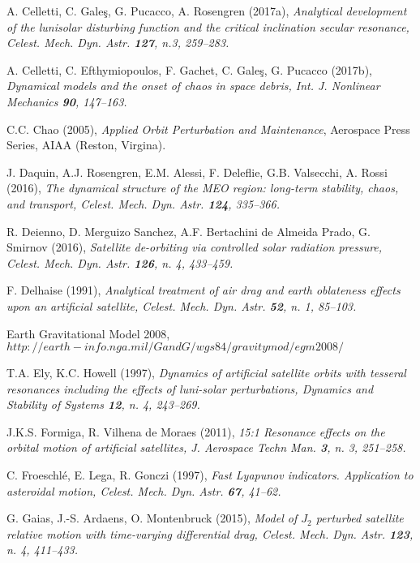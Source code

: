 \documentclass[12pt,reqno]{amsart}
\numberwithin{equation}{section}
\begin{document}
\begin{thebibliography}{}
A. Celletti, C. Gale\c s, G. Pucacco, A. Rosengren (2017a), \sl Analytical development of the lunisolar disturbing function and the critical
inclination secular resonance, \rm  Celest. Mech. Dyn. Astr. {\bf 127}, n.3, 259--283.

A. Celletti, C. Efthymiopoulos, F. Gachet, C. Gale\c s, G. Pucacco (2017b), \sl Dynamical models and the
onset of chaos in space debris, \rm Int. J. Nonlinear Mechanics {\bf 90}, 147--163.

 C.C. Chao (2005), {\em Applied Orbit Perturbation and Maintenance},
Aerospace Press Series, AIAA (Reston, Virgina).

J. Daquin, A.J. Rosengren, E.M. Alessi, F. Deleflie, G.B. Valsecchi, A. Rossi (2016), \sl The dynamical structure of the MEO region: long-term
stability, chaos, and transport, \rm Celest. Mech. Dyn. Astr. {\bf 124}, 335--366.

R. Deienno, D. Merguizo Sanchez, A.F. Bertachini de Almeida Prado, G. Smirnov (2016),
\sl Satellite de-orbiting via controlled solar radiation pressure, \rm
Celest. Mech. Dyn. Astr. {\bf 126}, n. 4, 433--459.


F. Delhaise (1991), \sl Analytical treatment of air drag and earth oblateness effects upon an artificial satellite, \rm
Celest. Mech. Dyn. Astr. {\bf 52}, n. 1, 85--103.

 Earth Gravitational Model 2008, $http://earth-info.nga.mil/GandG/wgs84/gravitymod/egm2008/$

T.A. Ely, K.C. Howell (1997), \sl Dynamics of artificial satellite orbits with
tesseral resonances including the effects of luni-solar perturbations, \rm
Dynamics and Stability of Systems {\bf 12}, n. 4, 243--269.

J.K.S. Formiga, R. Vilhena de Moraes (2011), \sl 15:1 Resonance effects on the orbital motion
of artificial satellites, \rm J. Aerospace Techn Man. {\bf 3}, n. 3, 251--258.

 C. Froeschl\'e, E. Lega, R. Gonczi (1997),
\sl Fast Lyapunov indicators. Application to asteroidal
motion, \rm Celest. Mech. Dyn. Astr. {\bf 67}, 41--62.

G. Gaias, J.-S. Ardaens, O. Montenbruck (2015), \sl Model of $J_2$
perturbed satellite relative motion with time-varying differential drag, \rm
Celest. Mech. Dyn. Astr. {\bf 123}, n. 4, 411--433.


\end{thebibliography}
\end{document}

